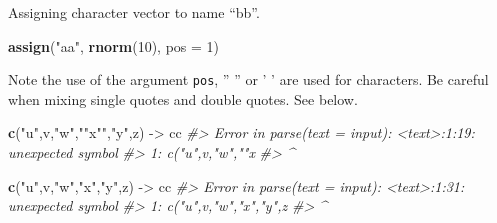\documentclass[
]{book}
\newenvironment{Shaded}{\begin{snugshade}}{\end{snugshade}}
\newcommand{\AttributeTok}[1]{\textcolor[rgb]{0.13,0.29,0.53}{#1}}
\newcommand{\CommentTok}[1]{\textcolor[rgb]{0.56,0.35,0.01}{\textit{#1}}}
\newcommand{\DecValTok}[1]{\textcolor[rgb]{0.00,0.00,0.81}{#1}}
\newcommand{\FunctionTok}[1]{\textcolor[rgb]{0.13,0.29,0.53}{\textbf{#1}}}
\newcommand{\NormalTok}[1]{#1}
\newcommand{\OtherTok}[1]{\textcolor[rgb]{0.56,0.35,0.01}{#1}}
\newcommand{\StringTok}[1]{\textcolor[rgb]{0.31,0.60,0.02}{#1}}
\begin{document}
Assigning character vector to name ``bb''.

\begin{Shaded}
\begin{Highlighting}[]
\FunctionTok{assign}\NormalTok{(}\StringTok{"aa"}\NormalTok{, }\FunctionTok{rnorm}\NormalTok{(}\DecValTok{10}\NormalTok{), }\AttributeTok{pos =} \DecValTok{1}\NormalTok{)}
\end{Highlighting}
\end{Shaded}

Note the use of the argument \texttt{pos}, '' '' or ' ' are used for characters. Be careful when mixing single quotes and double quotes. See below.

\begin{Shaded}
\begin{Highlighting}[]
\FunctionTok{c}\NormalTok{(}\StringTok{"u"}\NormalTok{,}\StringTok{\textquotesingle{}v\textquotesingle{}}\NormalTok{,}\StringTok{"\textquotesingle{}w\textquotesingle{}"}\NormalTok{,}\StringTok{""}\NormalTok{x}\StringTok{""}\NormalTok{,}\StringTok{\textquotesingle{}"y"\textquotesingle{}}\NormalTok{,}\StringTok{\textquotesingle{}\textquotesingle{}}\NormalTok{z}\StringTok{\textquotesingle{}\textquotesingle{}}\NormalTok{) }\OtherTok{{-}\textgreater{}}\NormalTok{ cc}
\CommentTok{\#\textgreater{} Error in parse(text = input): \textless{}text\textgreater{}:1:19: unexpected symbol}
\CommentTok{\#\textgreater{} 1: c("u",\textquotesingle{}v\textquotesingle{},"\textquotesingle{}w\textquotesingle{}",""x}
\CommentTok{\#\textgreater{}                       \^{}}
\end{Highlighting}
\end{Shaded}

\begin{Shaded}
\begin{Highlighting}[]
\FunctionTok{c}\NormalTok{(}\StringTok{"u"}\NormalTok{,}\StringTok{\textquotesingle{}v\textquotesingle{}}\NormalTok{,}\StringTok{"\textquotesingle{}w\textquotesingle{}"}\NormalTok{,}\StringTok{\textquotesingle{}"x"\textquotesingle{}}\NormalTok{,}\StringTok{\textquotesingle{}"y"\textquotesingle{}}\NormalTok{,}\StringTok{\textquotesingle{}\textquotesingle{}}\NormalTok{z}\StringTok{\textquotesingle{}\textquotesingle{}}\NormalTok{) }\OtherTok{{-}\textgreater{}}\NormalTok{ cc}
\CommentTok{\#\textgreater{} Error in parse(text = input): \textless{}text\textgreater{}:1:31: unexpected symbol}
\CommentTok{\#\textgreater{} 1: c("u",\textquotesingle{}v\textquotesingle{},"\textquotesingle{}w\textquotesingle{}",\textquotesingle{}"x"\textquotesingle{},\textquotesingle{}"y"\textquotesingle{},\textquotesingle{}\textquotesingle{}z}
\CommentTok{\#\textgreater{}                                   \^{}}
\end{Highlighting}
\end{Shaded}
\end{document}
